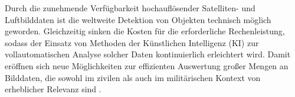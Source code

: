 


Durch die zunehmende Verfügbarkeit hochauflösender Satelliten- und Luftbilddaten ist die weltweite Detektion von Objekten technisch möglich geworden. Gleichzeitig sinken die Kosten für die erforderliche Rechenleistung, sodass der Einsatz von Methoden der Künstlichen Intelligenz (KI) zur vollautomatischen Analyse solcher Daten kontinuierlich erleichtert wird. Damit eröffnen sich neue Möglichkeiten zur effizienten Auswertung großer Mengen an Bilddaten, die sowohl im zivilen als auch im militärischen Kontext von erheblicher Relevanz sind \cite{Lemley2017}. 

